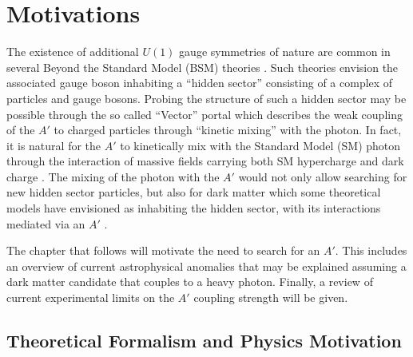 
\chapter{Motivations}

The existence of additional $U(1)$ gauge symmetries of nature are common in
several Beyond the Standard Model (BSM) theories 
\cite{Goodsell:2010ie, Abel:2008ai, Candelas:1985en, Andreas:2011in, Jaeckel:2010ni}.
Such theories envision the associated gauge boson  inhabiting a  ``hidden sector'' 
consisting of a complex of 
particles and gauge bosons.  Probing the structure of such a hidden sector may
be possible through the so called ``Vector'' portal which describes  
the weak coupling of the $A'$ to charged particles through ``kinetic mixing''
with the photon. In fact, it is natural for the $A'$ to 
kinetically mix with the Standard Model (SM) photon through the interaction
of massive fields carrying both SM hypercharge and dark charge \cite{Holdom:1985ag}.
The mixing of the photon with the $A'$ would not only allow searching for
new hidden sector particles, but also for dark matter which some theoretical models
have envisioned as inhabiting the hidden sector, with its interactions mediated
via an $A'$ 
\cite{ArkaniHamed:2008qn, Pospelov:2008jd, cheung2009, ArkaniHamed:2008qp}.

The chapter that follows will motivate the need to search for an $A'$.  
This includes an overview of current astrophysical anomalies
that may be explained assuming a dark matter candidate that couples to a 
heavy photon.  Finally, a review of current experimental limits on the $A'$ 
coupling strength will be given.

\section{Theoretical Formalism and Physics Motivation}

